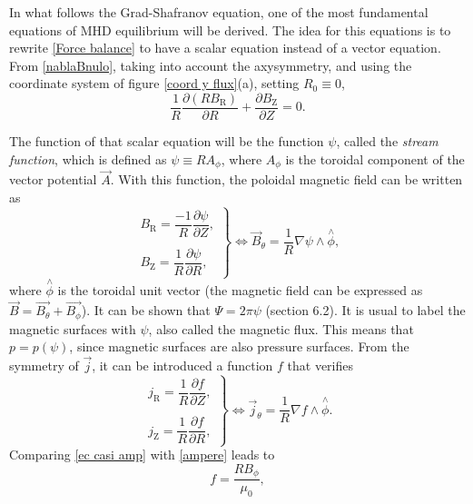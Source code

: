 \documentclass[a4paper,12pt,oneside]{book}
\newcommand{\p}{\partial}
\begin{document}
In what follows the Grad-Shafranov equation, one of the most fundamental equations of MHD equilibrium will be derived. The idea for this equations is to rewrite \eqref{Force balance} to have a scalar equation instead of a vector equation. From \eqref{nablaBnulo}, taking into account the axysymmetry, and using the coordinate system of figure \ref{coord y flux}(a), setting $R_0 \equiv 0$,
%
\begin{equation}
\dfrac{1}{R} \dfrac{\p (RB_\text{R})}{\p R}+ \dfrac{\p B_\text{Z}}{\p Z}=0.
\end{equation}

The function of that scalar equation will be the function $\psi$, called the \textit{stream function}, which is defined as $\psi \equiv R A_\phi$, where $A_\phi$ is the toroidal component of the vector potential $\vec{A}$. With this function, the poloidal magnetic field can be written as
%
\begin{equation}\label{ec 1}
\left.
\begin{array}{c}
B_\text{R}=\dfrac{-1}{R} \dfrac{\p \psi}{\p Z}, \\
\\
 B_\text{Z}=\dfrac{1}{R} \dfrac{\p \psi}{\p R},
\end{array}
\right\}
\Leftrightarrow \vec{B}_\theta=\dfrac{1}{R} \nabla \psi \wedge \stackrel{\wedge}{\phi},
\end{equation}
%
where $\stackrel{\wedge}{\phi}$ is the toroidal unit vector (the magnetic field can be expressed as $\vec{B}=\vec{B_\theta} +\vec{B_\phi}$). It can be shown that $\Psi=2 \pi \psi$ \cite{Freidberg} (section 6.2). It is usual to label the magnetic surfaces with $\psi$, also called the magnetic flux. This means that $p=p(\psi)$, since magnetic surfaces are also pressure surfaces.  From the symmetry of $\vec{j}$, it can be introduced a function $f$ that verifies
%
\begin{equation} \label{ec casi amp}
\left.
\begin{array}{c}
j_\text{R}=\dfrac{1}{R} \dfrac{\p f}{\p Z}, \\
\\
 j_\text{Z}=\dfrac{1}{R} \dfrac{\p f}{\p R},
\end{array}
\right\}
\Leftrightarrow \vec{j}_\theta=\dfrac{1}{R}\nabla f \wedge \stackrel{\wedge}{\phi}.
\end{equation}
%
Comparing \eqref{ec casi amp} with \eqref{ampere} leads to
%
\begin{equation}\label{ec_B_f}
f=\dfrac{R B_\phi}{\mu_0},
\end{equation}
\end{document}
